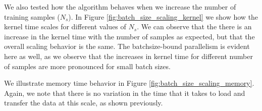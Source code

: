 \documentclass[11pt,a4paper]{article}
\begin{document}
We also tested how the algorithm behaves when we increase the number of
training samples ($N_s$). In Figure \ref{fig:batch_size_scaling_kernel} we show 
how the kernel time scales for different values of $N_s$. 
We can observe that the there is an increase in the kernel time with the 
number of samples as expected, but that the overall scaling behavior is the same. 
The batchsize-bound parallelism is evident here as well, as we observe that the increases in kernel 
time for different number of samples are more pronounced for small batch sizes. 

We illustrate memory time behavior in Figure \ref{fig:batch_size_scaling_memory}. Again, 
we note that there is no variation in the time that it takes to load and transfer the 
data at this scale, as shown previously.

\end{document}
